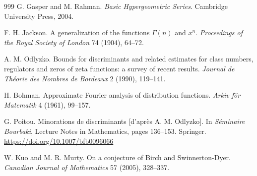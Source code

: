 \begin{thebibliography}{999}
 G. Gasper and M. Rahman. \emph{Basic Hypergeometric Series}. Cambridge University Press, 2004.

 F. H. Jackson. A generalization of the functions $\Gamma(n)$ and $x^n$. \emph{Proceedings of the Royal Society of London} 74 (1904), 64--72.


 A. M. Odlyzko. Bounds for discriminants and related estimates for class numbers, regulators and zeros of zeta functions: a survey of recent results. \emph{Journal de Th\'eorie des Nombres de Bordeaux} 2 (1990), 119--141.

 H. Bohman. Approximate Fourier analysis of distribution functions. \emph{Arkiv f\"or Matematik} 4 (1961), 99--157.

 G. Poitou. Minorations de discriminants [d'apr\`es A. M. Odlyzko]. In \emph{S\'eminaire Bourbaki}, Lecture Notes in Mathematics, pages 136--153. Springer. \url{https://doi.org/10.1007/bfb0096066}

 W. Kuo and M. R. Murty. On a conjecture of Birch and Swinnerton-Dyer. \emph{Canadian Journal of Mathematics} 57 (2005), 328--337.


\end{thebibliography}
